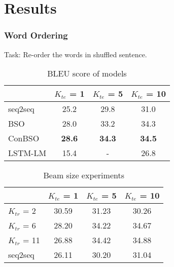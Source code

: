 \section{Results}

\begin{frame}
  \frametitle{Word Ordering}
  Task: Re-order the words in shuffled sentence.
  \begin{table}
    \centering
    \begin{tabular}{lccc}
      \toprule
      & $K_{te}$ = 1 & $K_{te}$ = 5 & $K_{te}$ = 10 \\ 
      \midrule
      seq2seq & 25.2 & 29.8 & 31.0 \\
      BSO     & 28.0 & 33.2 & 34.3 \\
      ConBSO & \textbf{28.6} & \textbf{34.3} & \textbf{34.5} \\
      \midrule
      LSTM-LM & 15.4 &  - & 26.8 \\
      \bottomrule
    \end{tabular}
    \caption{BLEU score of models}
    \label{tab:wo}
  \end{table}

  \begin{table}
    \centering
    \begin{tabular}{lccc}
      \toprule
      &  $K_{te}$ = 1 & $K_{te}$ = 5 & $K_{te}$ = 10 \\ 
      \midrule
      $K_{tr}$ = 2 & 30.59 & 31.23 & 30.26 \\
      $K_{tr}$ = 6 & 28.20 & 34.22 & 34.67 \\
      $K_{tr}$ = 11 & 26.88 & 34.42 & 34.88 \\   
      \midrule
      seq2seq & 26.11 & 30.20 & 31.04 \\         
      \bottomrule
    \end{tabular}
    \caption{Beam size experiments}
    \label{tab:wosizeexp}
  \end{table}
\end{frame}

